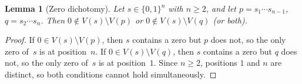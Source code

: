 \documentclass[11pt,a4paper]{article}
\theoremstyle{plain}
\newtheorem{lemma}[theorem]{Lemma}
\theoremstyle{definition}
\theoremstyle{remark}
\begin{document}
\begin{lemma}[Zero dichotomy]\label{lem:zero-dichotomy}
  Let $s \in \{0,1\}^n$ with $n \ge 2$, and let
  $p = s_1 \cdots s_{n-1}$, $q = s_2 \cdots s_n$.
  Then $0 \notin V(s) \setminus V(p)$ or
  $0 \notin V(s) \setminus V(q)$ (or both).
\end{lemma}

\begin{proof}
  If $0 \in V(s) \setminus V(p)$, then $s$ contains a zero but $p$
  does not, so the only zero of~$s$ is at position~$n$.
  If $0 \in V(s) \setminus V(q)$, then $s$ contains a zero but $q$
  does not, so the only zero of~$s$ is at position~$1$.
  Since $n \ge 2$, positions $1$ and $n$ are distinct, so both
  conditions cannot hold simultaneously.
\end{proof}
\end{document}
